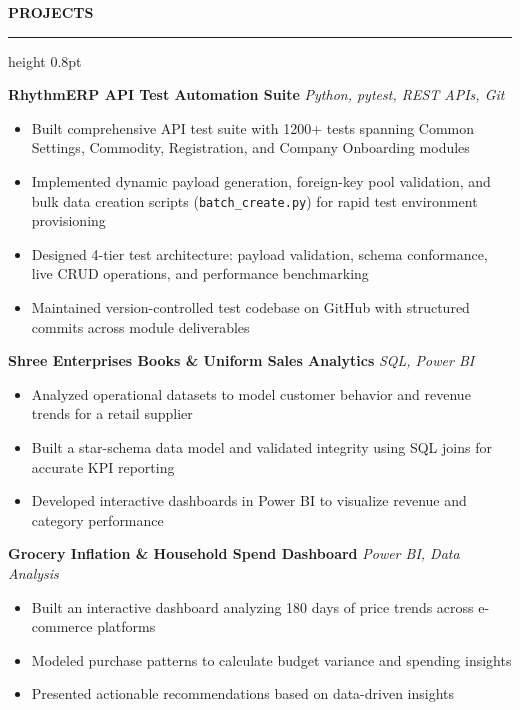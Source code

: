 \documentclass[11pt,letterpaper]{article}
\renewcommand{\section}[1]{
  \vspace{6pt}
  {\bfseries\large #1}
  \vspace{2pt}
  \hrule height 0.8pt
  \vspace{4pt}
}
\begin{document}
\section{PROJECTS}

\textbf{RhythmERP API Test Automation Suite} \hfill \textit{Python, pytest, REST APIs, Git}
\begin{itemize}
  \item Built comprehensive API test suite with 1200+ tests spanning Common Settings, Commodity, Registration, and Company Onboarding modules
  \item Implemented dynamic payload generation, foreign-key pool validation, and bulk data creation scripts (\texttt{batch\_create.py}) for rapid test environment provisioning
  \item Designed 4-tier test architecture: payload validation, schema conformance, live CRUD operations, and performance benchmarking
  \item Maintained version-controlled test codebase on GitHub with structured commits across module deliverables
\end{itemize}

\vspace{3pt}

\textbf{Shree Enterprises Books \& Uniform Sales Analytics} \hfill \textit{SQL, Power BI}
\begin{itemize}
  \item Analyzed operational datasets to model customer behavior and revenue trends for a retail supplier
  \item Built a star-schema data model and validated integrity using SQL joins for accurate KPI reporting
  \item Developed interactive dashboards in Power BI to visualize revenue and category performance
\end{itemize}

\vspace{3pt}

\textbf{Grocery Inflation \& Household Spend Dashboard} \hfill \textit{Power BI, Data Analysis}
\begin{itemize}
  \item Built an interactive dashboard analyzing 180 days of price trends across e-commerce platforms
  \item Modeled purchase patterns to calculate budget variance and spending insights
  \item Presented actionable recommendations based on data-driven insights
\end{itemize}
\end{document}
